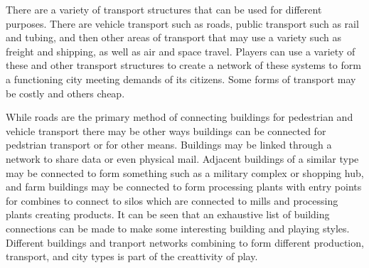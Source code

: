 There are a variety of transport structures that can be used for different purposes. There are vehicle transport such as roads, public transport such as rail and tubing, and then other areas of transport that may use a variety such as freight and shipping, as well as air and space travel. Players can use a variety of these and other transport structures to create a network of these systems to form a functioning city meeting demands of its citizens. Some forms of transport may be costly and others cheap. 

While roads are the primary method of connecting buildings for pedestrian and vehicle transport there may be other ways buildings can be connected for pedstrian transport or for other means. Buildings may be linked through a network to share data or even physical mail. Adjacent buildings of a similar type may be connected to form something such as a military complex or shopping hub, and farm buildings may be connected to form processing plants with entry points for combines to connect to silos which are connected to mills and processing plants creating products. It can be seen that an exhaustive list of building connections can be made to make some interesting building and playing styles. Different buildings and tranport networks combining to form different production, transport, and city types is part of the creattivity of play.
